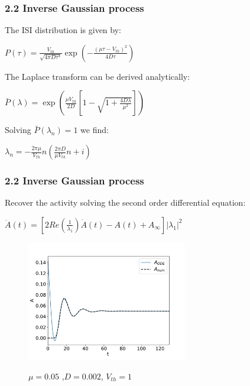 \documentclass{beamer}
\begin{document}
\begin{frame}
\frametitle{2.2 Inverse Gaussian process}
The ISI distribution is given by: 	

\vspace{0.2cm}
\hspace{2.5cm}$P(\tau)=\frac{V_{th}}{\sqrt{4\pi D\tau^3}}\exp(-\frac{(\mu\tau-V_{th})^2}{4D\tau})$


\pause
\vspace{0.3cm}
The Laplace transform can be derived analytically:

\vspace{0.2cm}
\hspace{2.5cm}$\bar{P}(\lambda)=\exp(\frac{\mu V_{th}}{2D}[1-\sqrt{1+\frac{4D\lambda}{\mu^2}}])$

\pause
\vspace{0.3cm}
Solving $\bar{P}(\lambda_n)=1$ we find:

\vspace{0.2cm}
\hspace{2.8cm} $\lambda_n=- \frac{2\pi\mu}{V_{th}}n( \frac{2\pi D}{\mu V_{th}}n + i)$



\end{frame}

\begin{frame}
\frametitle{2.2 Inverse Gaussian process}

Recover the activity solving the  second order differential equation:

\hspace{3cm} $\ddot A(t)=[2Re(\frac{1}{\lambda_1})\dot A(t)-A(t)+A_{\infty}] |{\lambda_1}|^2$

\begin{figure}
\centering

\includegraphics[width=70mm]{AODE.pdf}

\vspace{0.5cm}
\small{$\mu=0.05$ ,$D=0.002$, $V_{th}=1$}

\end{figure}



\end{frame}
\end{document}
